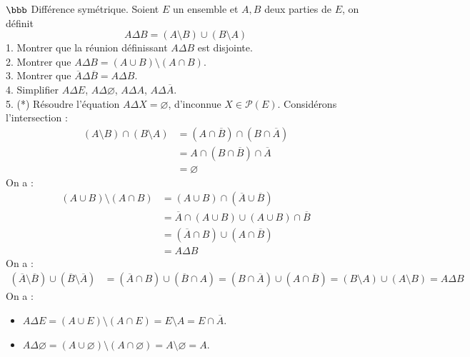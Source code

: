 \documentclass[11pt]{article}
\begin{document}
\begin{exercice}{$\bbb$ Différence symétrique.}{}
    Soient $E$ un ensemble et $A,B$ deux parties de $E$, on définit 
    \begin{equation*}
        A \Delta B = (A \setminus B) \cup (B \setminus A)
    \end{equation*}
    1. Montrer que la réunion définissant $A \Delta B$ est disjointe.\\
    2. Montrer que $A \Delta B = (A \cup B) \setminus (A \cap B)$.\\
    3. Montrer que $\overline{A} \Delta \overline{B} = A \Delta B$.\\
    4. Simplifier $A \Delta E$, $A \Delta \varnothing$, $A \Delta A$, $A \Delta \overline{A}$.\\
    5. (*) Résoudre l'équation $A \Delta X = \varnothing$, d'inconnue $X \in \mathcal{P}(E)$.
    \tcblower
     Considérons l'intersection :
    \begin{align*}
        (A \setminus B) \cap (B \setminus A) &= (A \cap \overline{B}) \cap (B \cap \overline{A})\\
        &=A \cap (B \cap \overline{B}) \cap \overline{A}\\
        &=\varnothing
    \end{align*}
     On a :
    \begin{align*}
        (A \cup B) \setminus (A \cap B) &= (A \cup B) \cap (\overline{A} \cup \overline{B})\\
        &=\overline{A} \cap (A \cup B) \cup (A \cup B) \cap \overline{B}\\
        &=(\overline{A} \cap B) \cup (A \cap \overline{B})\\
        &=A \Delta B
    \end{align*}
     On a :
    \begin{align*}
        (\overline{A} \setminus \overline{B}) \cup (\overline{B} \setminus \overline{A}) &= (\overline{A} \cap B) \cup (\overline{B} \cap A)
        =(B \cap \overline{A}) \cup (A \cap \overline{B})
        =(B \setminus A) \cup (A \setminus B)
        =A \Delta B
    \end{align*}
     On a :
    \begin{itemize}
        \item $A \Delta E = (A \cup E) \setminus (A \cap E) = E \setminus A = E \cap \overline{A}$.
        \item $A \Delta \varnothing = (A \cup \varnothing) \setminus (A \cap \varnothing) = A \setminus \varnothing = A$.

\end{itemize}
\end{exercice}
\end{document}
